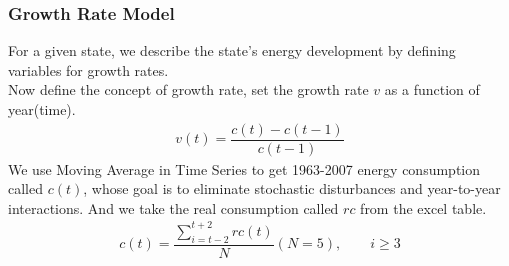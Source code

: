 \documentclass{mcmthesis}
\begin{document}
\subsubsection{Growth Rate Model}
For a given state, we describe the state's energy development by defining variables for growth rates.\\
Now define the concept of growth rate, set the growth rate $ v $ as a function of year(time).\\
\begin{align}
v(t)=\dfrac{c(t)-c(t-1)}{c(t-1)}
\end{align}
We use Moving Average in Time Series to get 1963-2007 energy consumption called $ c(t) $\cite{mova}, whose goal is to eliminate stochastic disturbances and year-to-year interactions. And we take the real consumption called $ \mathit{rc} $ from the excel table.\\
\begin{align}
c(t)=\dfrac{\sum_{i=t-2}^{t+2}\mathit{rc(t)}}{N}(N=5),\qquad i\geq 3
\end{align}
\end{document}
